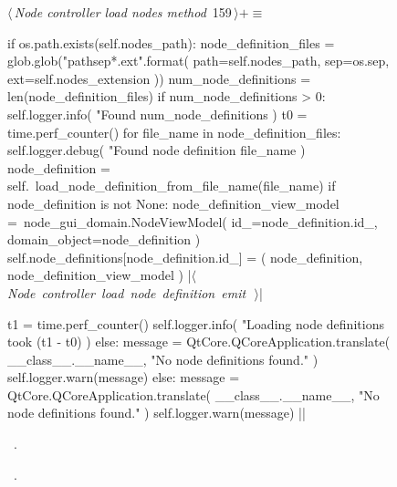 \documentclass[%
    a4paper,    %
    justified,  %
    nobib,      %
    openany     %
]{tufte-book}
\makeatletter
\renewcommand{\label}[1]{\@tufte@label{##1}}%
\makeatother
\begin{document}
\begin{figure}[!htbp]
\begin{flushleft} \small
\begin{minipage}{\linewidth}\label{scrap122}\raggedright\small
{} $\langle\,${\itshape Node controller load nodes method}\nobreak\ {\footnotesize {159}}$\,\rangle+\equiv$
\vspace{-1ex}
\begin{pythoncode}

if os.path.exists(self.nodes_path):
    node_definition_files = glob.glob("{path}{sep}*.{ext}".format(
        path=self.nodes_path,
        sep=os.sep,
        ext=self.nodes_extension
    ))
    num_node_definitions = len(node_definition_files)
    if num_node_definitions > 0:
        self.logger.info(
            "Found %
            num_node_definitions
        )
        t0 = time.perf_counter()
        for file_name in node_definition_files:
            self.logger.debug(
                "Found node definition %
                file_name
            )
            node_definition = self.\
                load_node_definition_from_file_name(file_name)
            if node_definition is not None:
                node_definition_view_model =\
                node_gui_domain.NodeViewModel(
                    id_=node_definition.id_,
                    domain_object=node_definition
                )
                self.node_definitions[node_definition.id_] = (
                    node_definition,
                    node_definition_view_model
                )
                |\hbox{$\langle\,${\itshape Node controller load node definition emit}\nobreak\ {\footnotesize {}}$\,\rangle$}|

        t1 = time.perf_counter()
        self.logger.info(
            "Loading node definitions took %
            (t1 - t0)
        )
    else:
        message = QtCore.QCoreApplication.translate(
            __class__.__name__, "No node definitions found."
        )
        self.logger.warn(message)
else:
    message = QtCore.QCoreApplication.translate(
        __class__.__name__, "No node definitions found."
    )
    self.logger.warn(message)
|\NWsep|
\end{pythoncode}
\vspace{1.5ex}
\footnotesize
\begin{list}{}{\setlength{\itemsep}{-\parsep}\setlength{\itemindent}{-\leftmargin}}
\item \NWtxtMacroDefBy\ .
\item \NWtxtMacroRefIn\ \NWlink{nuweb150a}{150a}.


\end{list}
\end{minipage}
\end{flushleft}
\end{figure}
\end{document}
